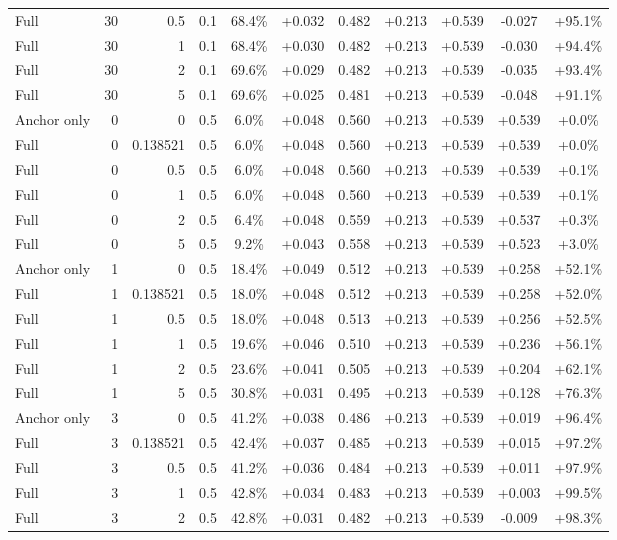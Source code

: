 \begin{table}[htbp]
\begin{tabular}{lrrrccccccc}
Full & 30 & 0.5 & 0.1 & 68.4\% & +0.032 & 0.482 & +0.213 & +0.539 & -0.027 & +95.1\% \\
Full & 30 & 1 & 0.1 & 68.4\% & +0.030 & 0.482 & +0.213 & +0.539 & -0.030 & +94.4\% \\
Full & 30 & 2 & 0.1 & 69.6\% & +0.029 & 0.482 & +0.213 & +0.539 & -0.035 & +93.4\% \\
Full & 30 & 5 & 0.1 & 69.6\% & +0.025 & 0.481 & +0.213 & +0.539 & -0.048 & +91.1\% \\
Anchor only & 0 & 0 & 0.5 & 6.0\% & +0.048 & 0.560 & +0.213 & +0.539 & +0.539 & +0.0\% \\
Full & 0 & 0.138521 & 0.5 & 6.0\% & +0.048 & 0.560 & +0.213 & +0.539 & +0.539 & +0.0\% \\
Full & 0 & 0.5 & 0.5 & 6.0\% & +0.048 & 0.560 & +0.213 & +0.539 & +0.539 & +0.1\% \\
Full & 0 & 1 & 0.5 & 6.0\% & +0.048 & 0.560 & +0.213 & +0.539 & +0.539 & +0.1\% \\
Full & 0 & 2 & 0.5 & 6.4\% & +0.048 & 0.559 & +0.213 & +0.539 & +0.537 & +0.3\% \\
Full & 0 & 5 & 0.5 & 9.2\% & +0.043 & 0.558 & +0.213 & +0.539 & +0.523 & +3.0\% \\
Anchor only & 1 & 0 & 0.5 & 18.4\% & +0.049 & 0.512 & +0.213 & +0.539 & +0.258 & +52.1\% \\
Full & 1 & 0.138521 & 0.5 & 18.0\% & +0.048 & 0.512 & +0.213 & +0.539 & +0.258 & +52.0\% \\
Full & 1 & 0.5 & 0.5 & 18.0\% & +0.048 & 0.513 & +0.213 & +0.539 & +0.256 & +52.5\% \\
Full & 1 & 1 & 0.5 & 19.6\% & +0.046 & 0.510 & +0.213 & +0.539 & +0.236 & +56.1\% \\
Full & 1 & 2 & 0.5 & 23.6\% & +0.041 & 0.505 & +0.213 & +0.539 & +0.204 & +62.1\% \\
Full & 1 & 5 & 0.5 & 30.8\% & +0.031 & 0.495 & +0.213 & +0.539 & +0.128 & +76.3\% \\
Anchor only & 3 & 0 & 0.5 & 41.2\% & +0.038 & 0.486 & +0.213 & +0.539 & +0.019 & +96.4\% \\
Full & 3 & 0.138521 & 0.5 & 42.4\% & +0.037 & 0.485 & +0.213 & +0.539 & +0.015 & +97.2\% \\
Full & 3 & 0.5 & 0.5 & 41.2\% & +0.036 & 0.484 & +0.213 & +0.539 & +0.011 & +97.9\% \\
Full & 3 & 1 & 0.5 & 42.8\% & +0.034 & 0.483 & +0.213 & +0.539 & +0.003 & +99.5\% \\
Full & 3 & 2 & 0.5 & 42.8\% & +0.031 & 0.482 & +0.213 & +0.539 & -0.009 & +98.3\% \\

\end{tabular}
\end{table}
